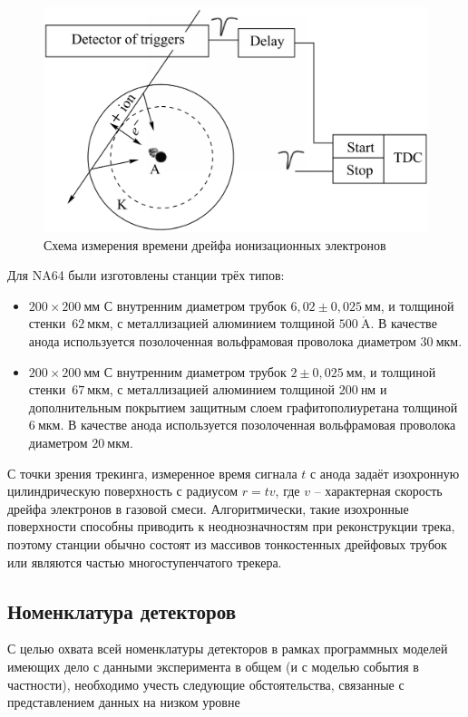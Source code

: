 \begin{figure}
    \centering
    \includegraphics[width=0.5\linewidth]{images//illustrative/strawa-principle.png}
    \caption{Схема измерения времени дрейфа ионизационных электронов~\cite{straws-peshekhonov2015}}
    \label{fig:straws-measurement}
\end{figure}

Для NA64 были изготовлены станции трёх типов:
\begin{itemize}
    \item $200\times200~\text{мм}$ С внутренним диаметром
    трубок $6{,}02 \pm 0{,}025~\text{мм}$, и толщиной
    стенки~$62~\text{мкм}$, с металлизацией алюминием толщиной $500~\mathring{\text{A}}$.
    В качестве анода используется позолоченная вольфрамовая проволока диаметром $30~\text{мкм}$.
    \item $200\times200~\text{мм}$ С внутренним диаметром
    трубок $2 \pm 0{,}025~\text{мм}$, и толщиной
    стенки~$67~\text{мкм}$, с металлизацией алюминием толщиной $200~\text{нм}$
    и дополнительным покрытием защитным слоем графитополиуретана толщиной~$6~\text{мкм}$.
    В качестве анода используется позолоченная вольфрамовая проволока диаметром
    $20~\text{мкм}$.
\end{itemize}

С точки зрения трекинга, измеренное время сигнала $t$ с анода задаёт
изохронную цилиндрическую поверхность с радиусом $r = t v$, где
$v$ -- характерная скорость дрейфа электронов в газовой смеси.
Алгоритмически, такие изохронные поверхности способны приводить к
неоднозначностям при реконструкции трека, поэтому станции обычно состоят
из массивов тонкостенных дрейфовых трубок или являются частью
многоступенчатого трекера.

\subsection{Номенклатура детекторов}

С целью охвата всей номенклатуры детекторов в рамках программных
моделей имеющих дело с данными эксперимента в общем (и с моделью
события в частности), необходимо учесть следующие обстоятельства,
связанные с представлением данных на низком уровне 

